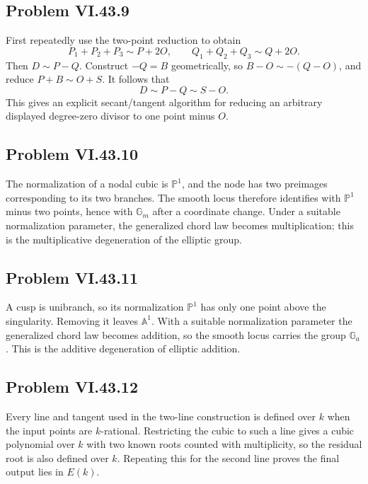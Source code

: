 \subsection*{Problem VI.43.9}
\begin{solution}
First repeatedly use the two-point reduction to obtain
\[
P_1+P_2+P_3\sim P+2O,\qquad
Q_1+Q_2+Q_3\sim Q+2O.
\]
Then \(D\sim P-Q\).  Construct \(-Q=B\) geometrically, so \(B-O\sim-(Q-O)\), and reduce \(P+B\sim O+S\).  It follows that
\[
D\sim P-Q\sim S-O.
\]
This gives an explicit secant/tangent algorithm for reducing an arbitrary displayed degree-zero divisor to one point minus \(O\).
\end{solution}

\subsection*{Problem VI.43.10}
\begin{solution}
The normalization of a nodal cubic is \(\mathbb P^1\), and the node has two preimages corresponding to its two branches.  The smooth locus therefore identifies with \(\mathbb P^1\) minus two points, hence with \(\mathbb G_m\) after a coordinate change.  Under a suitable normalization parameter, the generalized chord law becomes multiplication; this is the multiplicative degeneration of the elliptic group.
\end{solution}

\subsection*{Problem VI.43.11}
\begin{solution}
A cusp is unibranch, so its normalization \(\mathbb P^1\) has only one point above the singularity.  Removing it leaves \(\mathbb A^1\).  With a suitable normalization parameter the generalized chord law becomes addition, so the smooth locus carries the group \(\mathbb G_a\).  This is the additive degeneration of elliptic addition.
\end{solution}

\subsection*{Problem VI.43.12}
\begin{solution}
Every line and tangent used in the two-line construction is defined over \(k\) when the input points are \(k\)-rational.  Restricting the cubic to such a line gives a cubic polynomial over \(k\) with two known roots counted with multiplicity, so the residual root is also defined over \(k\).  Repeating this for the second line proves the final output lies in \(E(k)\).
\end{solution}

